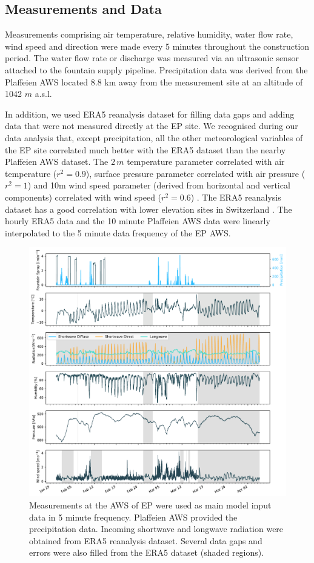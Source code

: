 \documentclass[utf8]{frontiersSCNS} %
\begin{document}
\subsection{Measurements and Data}
Measurements comprising air temperature, relative humidity, water flow rate, wind speed and direction were made every
5 minutes throughout the construction period. The water flow rate or discharge was measured via an ultrasonic
sensor attached to the fountain supply pipeline. Precipitation data was derived from the Plaffeien AWS
\citep{meteoswiss} located 8.8 km away from the measurement site at an altitude of 1042 $m$ a.s.l.  

In addition, we used ERA5 reanalysis dataset \citep{era5} for filling data gaps and adding data that were not measured
directly at the EP site. We recognised during our data analysis that, except precipitation, all the other
meteorological variables of the EP site correlated much better with the ERA5 dataset than the nearby Plaffeien
AWS dataset. The $2\,m$ temperature parameter correlated with air temperature ($r^2 =0.9 $), surface pressure
parameter correlated with air pressure ($r^2 = 1$) and 10m wind speed parameter (derived from horizontal and vertical
components) correlated with wind speed ($r^2 =0.6 $) . The ERA5 reanalysis dataset has a good
correlation with lower elevation sites in Switzerland \citep{Scherrer_2020}. The hourly ERA5 data and the 10 minute
Plaffeien AWS data were linearly interpolated to the 5 minute data frequency of the EP AWS. 
  
\begin{figure} \centering \includegraphics[width=\linewidth]{./Figures/Figure_3} \caption{Measurements at the AWS of EP
were used as main model input data in 5 minute frequency. Plaffeien AWS provided the precipitation data.  Incoming
shortwave and longwave radiation were obtained from ERA5 reanalysis dataset. Several data gaps and errors were also
filled from the ERA5 dataset (shaded regions).} \label{fig:input} \end{figure}
\end{document}
